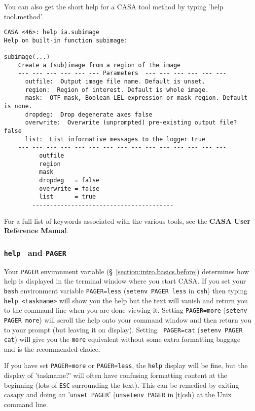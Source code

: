 You can also get the short help for a CASA tool method by typing 'help tool.method'.
\small  
\begin{verbatim}
CASA <46>: help ia.subimage
Help on built-in function subimage:

subimage(...)
    Create a (sub)image from a region of the image
    --- --- --- --- --- --- Parameters  --- --- --- --- --- ---
      outfile:  Output image file name. Default is unset. 
      region:  Region of interest. Default is whole image. 
      mask:  OTF mask, Boolean LEL expression or mask region. Default is none. 
      dropdeg:  Drop degenerate axes false 
      overwrite:  Overwrite (unprompted) pre-existing output file? false 
      list:  List informative messages to the logger true 
    --- --- --- --- --- --- --- --- --- --- --- --- --- --- --- 
          outfile
          region
          mask
          dropdeg   = false
          overwrite = false
          list      = true
        ----------------------------------------
\end{verbatim}
\normalsize

For a full list of keywords associated with the various tools,
see the {\bf CASA User Reference Manual}.  

\subsubsection{{\tt help } and {\tt PAGER}}
\label{section:intro.basics.help.page}

Your {\tt PAGER} environment variable (\S~\ref{section:intro.basics.before})
determines how help is displayed
in the terminal window where you start CASA. If you set your {\tt
bash} environment variable {\tt PAGER=less} ({\tt setenv PAGER less}
in {\tt csh}) then typing {\tt help <taskname>} will show you the help
but the text will vanish and return you to the command line when you
are done viewing it. Setting {\tt PAGER=more} ({\tt setenv PAGER
more}) will scroll the help onto your command window and then return
you to your prompt (but leaving it on display). Setting {\tt
PAGER=cat} ({\tt setenv PAGER cat}) will give you the {\tt more}
equivalent without some extra formatting baggage and is the
recommended choice.

If you have set {\tt PAGER=more}
or {\tt PAGER=less}, the {\tt help} display will be fine, but the display of
'taskname?' will often have confusing formatting content at the
beginning (lots of {\tt ESC} surrounding the text). This can be remedied
by exiting casapy and doing an '{\tt unset PAGER}' 
({\tt unsetenv PAGER} in [t]csh) at the Unix command line.

